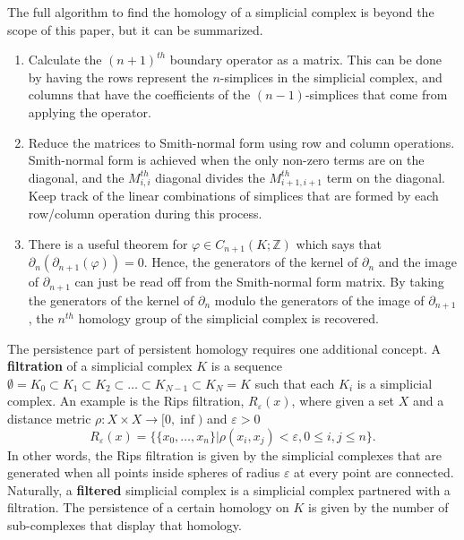\documentclass[a4paper,12pt]{report}
\begin{document}
The full algorithm to find the homology of a simplicial complex is beyond the scope of this paper, but it can be summarized. 
\begin{enumerate}
 \item Calculate the $(n+1)^{th}$ boundary operator as a matrix. This can be done by having the rows represent the $n$-simplices in the simplicial complex, and columns that have the coefficients of the $(n-1)$-simplices that come from applying the operator.
 \item Reduce the matrices to Smith-normal form using row and column operations. Smith-normal form is achieved when the only non-zero terms are on the diagonal, and the $M_{i,i}^{th}$ diagonal divides the $M_{i+1,i+1}^{th}$ term on the diagonal. Keep track of the linear combinations of simplices that are formed by each row/column operation during this process.
 \item There is a useful theorem for $\varphi\in C_{n+1}(K;\mathbb{Z})$ which says that $\partial_{n}(\partial_{n+1}(\varphi)) = 0$. Hence, the generators of the kernel of $\partial_n$ and the image of $\partial_{n+1}$ can just be read off from the Smith-normal form matrix. By taking the generators of the kernel of $\partial_n$ modulo the generators of the image of $\partial_{n+1}$, the $n^{th}$ homology group of the simplicial complex is recovered.
\end{enumerate}

The persistence part of persistent homology requires one additional concept. A \textbf{filtration} of a simplicial complex $K$ is a sequence $\emptyset = K_0\subset K_1\subset K_2\subset \ldots\subset K_{N-1}\subset K_N = K$ such that each $K_i$ is a simplicial complex. An example is the Rips filtration, $R_\varepsilon(x)$, where given a set $X$ and a distance metric $\rho: X\times X\rightarrow [0,\inf)$ and $\varepsilon > 0$
\[
 R_\varepsilon(x) = \{\{x_0,\ldots,x_n\}|\rho(x_i,x_j)<\varepsilon, 0\leq i,j \leq n\}.
\]
In other words, the Rips filtration is given by the simplicial complexes that are generated when all points inside spheres of radius $\varepsilon$ at every point are connected. Naturally, a \textbf{filtered} simplicial complex is a simplicial complex partnered with a filtration. The persistence of a certain homology on $K$ is given by the number of sub-complexes that display that homology. 
\end{document}
